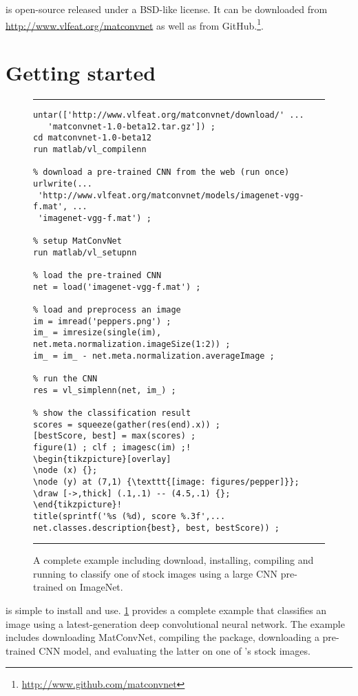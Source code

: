 \matconvnet is open-source released under a BSD-like license. It can be downloaded from \url{http://www.vlfeat.org/matconvnet} as well as from GitHub.\footnote{\small\url{http://www.github.com/matconvnet}}.

\section{Getting started}\label{s:getting-statrted}

\begin{figure}
\hrule
\begin{lstlisting}[escapechar=!]
% install and compile MatConvNet (run once)
untar(['http://www.vlfeat.org/matconvnet/download/' ...
   'matconvnet-1.0-beta12.tar.gz']) ;
cd matconvnet-1.0-beta12
run matlab/vl_compilenn

% download a pre-trained CNN from the web (run once)
urlwrite(...
 'http://www.vlfeat.org/matconvnet/models/imagenet-vgg-f.mat', ...
 'imagenet-vgg-f.mat') ;
  
% setup MatConvNet
run matlab/vl_setupnn

% load the pre-trained CNN
net = load('imagenet-vgg-f.mat') ;

% load and preprocess an image
im = imread('peppers.png') ;
im_ = imresize(single(im), net.meta.normalization.imageSize(1:2)) ;
im_ = im_ - net.meta.normalization.averageImage ;

% run the CNN
res = vl_simplenn(net, im_) ;

% show the classification result
scores = squeeze(gather(res(end).x)) ;
[bestScore, best] = max(scores) ;
figure(1) ; clf ; imagesc(im) ;!
\begin{tikzpicture}[overlay]
\node (x) {};
\node (y) at (7,1) {\texttt{[image: figures/pepper]}};
\draw [->,thick] (.1,.1) -- (4.5,.1) {};
\end{tikzpicture}!
title(sprintf('%s (%d), score %.3f',...
net.classes.description{best}, best, bestScore)) ;
\end{lstlisting}
\hrule
\caption{A complete example including download, installing, compiling and running  \matconvnet to classify one of  \matlab stock images using a large CNN pre-trained on ImageNet.}
\label{f:demo}
\end{figure}

\matconvnet is simple to install and use. \cref{f:demo} provides a complete example that classifies an image using a latest-generation deep convolutional neural network. The example includes downloading MatConvNet, compiling the package, downloading a pre-trained CNN model, and evaluating the latter on one of \matlab's stock images.

